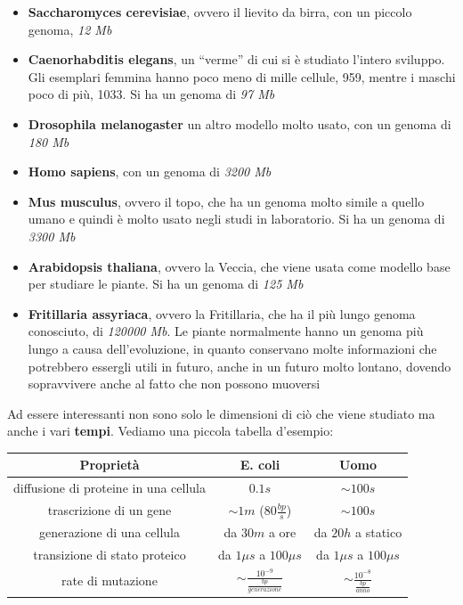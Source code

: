 \documentclass[a4paper,12pt, oneside]{book}
\begin{document}
\begin{itemize}
  \item \textbf{Saccharomyces cerevisiae}, ovvero il lievito da birra, con un
  piccolo genoma, \textit{12 Mb}
  \item \textbf{Caenorhabditis elegans}, un ``verme'' di cui si è studiato
  l'intero sviluppo. Gli esemplari femmina hanno poco meno di mille cellule,
  959, mentre i maschi poco di più, 1033. Si ha un genoma di \textit{97 Mb}
  \item \textbf{Drosophila melanogaster} un altro modello molto usato, con un
  genoma di \textit{180 Mb}
  \item \textbf{Homo sapiens}, con un genoma di \textit{3200 Mb}
  \item \textbf{Mus musculus}, ovvero il topo, che ha un genoma molto simile a
  quello umano e quindi è molto usato negli studi in laboratorio. Si ha un
  genoma di \textit{3300 Mb} 
  \item \textbf{Arabidopsis thaliana}, ovvero la Veccia, che viene usata come
  modello base per studiare le piante. Si ha un genoma di \textit{125 Mb} 
  \item \textbf{Fritillaria assyriaca}, ovvero la Fritillaria, che ha il più
  lungo genoma conosciuto, di \textit{120000 Mb}. Le piante normalmente hanno un
  genoma più lungo a causa dell'evoluzione, in quanto conservano molte
  informazioni che potrebbero essergli utili in futuro, anche in un futuro molto
  lontano, dovendo sopravvivere anche al fatto che non possono muoversi
\end{itemize}
Ad essere interessanti non sono solo le dimensioni di ciò che viene studiato ma
anche i vari \textbf{tempi}. Vediamo una piccola tabella d'esempio:
\begin{table}[H]
  \small
  \centering
  \begin{tabular}{c|c|c}
    \textbf{Proprietà} & \textbf{E. coli} & \textbf{Uomo}\\
    \hline
    \hline
    diffusione di proteine in una cellula & $0.1 s$ & $\sim 100 s$\\
    \hline
    trascrizione di un gene & $\sim 1m$ ($80\frac{bp}{s}$) & $\sim 100 s$\\
    \hline
    generazione di una cellula & da $30 m$ a ore & da $20h$ a statico\\
    \hline
    transizione di stato proteico & da $1\mu s$ a $100\mu s$
                                          & da $1\mu s$ a $100\mu s$\\
    \hline
    rate di mutazione & $\sim \frac{10^{-9}}{\frac{bp}{generazione}}$
                                      & $\sim \frac{10^{-8}}{\frac{bp}{anno}}$\\
  \end{tabular}
\end{table}
\end{document}
